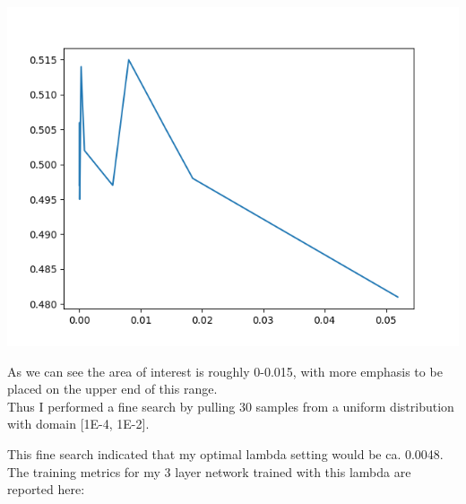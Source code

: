 \documentclass[11pt,a4paper]{article}
\begin{document}
\includegraphics[width=\textwidth]{coarse_search.png}

As we can see the area of interest is roughly 0-0.015, with more emphasis to be placed on the upper end of this range.\\

Thus I performed a fine search by pulling 30 samples from a uniform distribution with domain [1E-4, 1E-2].




This fine search indicated that my optimal lambda setting would be ca. 0.0048. \\

The training metrics for my 3 layer network trained with this lambda are reported here:\\
\end{document}
